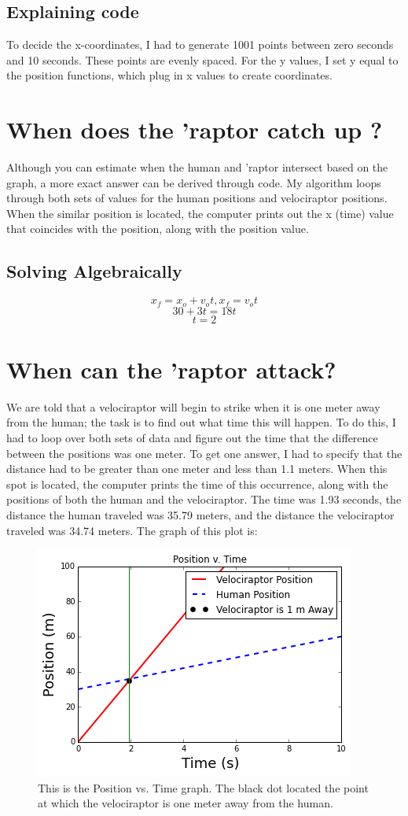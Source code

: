 \documentclass[twocolumn]{revtex4}
\begin{document}
\subsection{Explaining code}
To decide the x-coordinates, I had to generate 1001 points between zero seconds and 10 seconds.  These points are evenly spaced.  For the y values, I set y equal to the position functions, which plug in x values to create coordinates.  

\section{When does the 'raptor catch up ?}
Although you can estimate when the human and 'raptor intersect based on the graph, a more exact answer can be derived through code.  My algorithm loops through both sets of values for the human positions and velociraptor positions.  When the similar position is located, the computer prints out the x (time) value that coincides with the position, along with the position value.  

\subsection{Solving Algebraically}
$$ x_f = x_o + v_ot , x_f = v_ot $$ 
$$ 30 + 3t = 18t $$ 
$$ t = 2 $$

\section{When can the 'raptor attack?}
We are told that a velociraptor will begin to strike when it is one meter away from the human;  the task is to find out what time this will happen.  To do this, I had to loop over both sets of data and figure out the time that the difference between the positions was one meter.  To get one answer, I had to specify that the distance had to be greater than one meter and less than 1.1 meters.  When this spot is located, the computer prints the time of this occurrence, along with the positions of both the human and the velociraptor. The time was 1.93 seconds, the distance the human traveled was 35.79 meters, and the distance the velociraptor traveled was 34.74 meters.  The graph of this plot is: 

\begin{figure}[h!]
	\centering
	\includegraphics[width = .5\textwidth]{pvtline.png}
	\caption{This is the Position vs. Time graph.  The black dot located the point at which the velociraptor is one meter away from the human.  \label{ptoe2}}
\end{figure}
\end{document}
